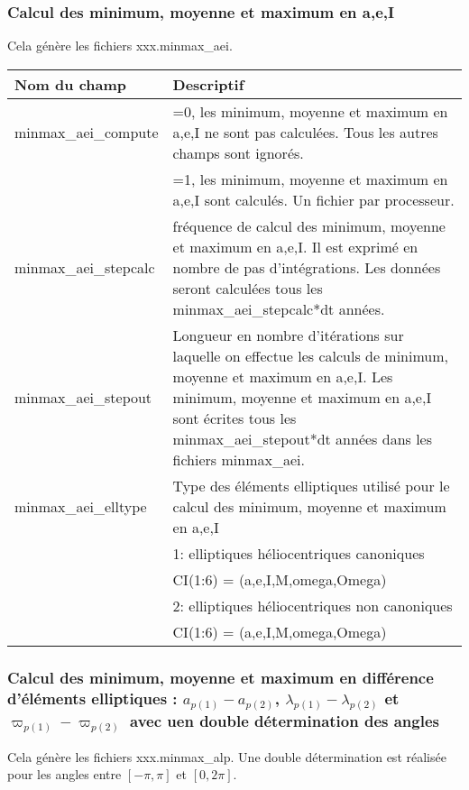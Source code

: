 \documentclass[11pt]{article}
\begin{document}
\vspace{0.5cm}
\subsubsection*{Calcul des minimum, moyenne et maximum en a,e,I}
Cela g\'en\`ere les fichiers xxx.minmax\_aei.

\begin{tabularx}{\textwidth}{|l|X|}
\hline
Nom du champ& Descriptif \\ \hline \hline
minmax\_aei\_compute &  =0, les minimum, moyenne et maximum en a,e,I ne sont pas calcul\'ees. Tous les autres champs sont ignor\'es.\\
&=1, les minimum, moyenne et maximum en a,e,I sont calcul\'es. Un fichier par processeur.\\ \hline

minmax\_aei\_stepcalc  & fr\'equence de calcul des minimum, moyenne et maximum en a,e,I. Il est exprim\'e en nombre de pas d'int\'egrations. Les donn\'ees seront calcul\'ees tous les minmax\_aei\_stepcalc*dt ann\'ees. \\ \hline

minmax\_aei\_stepout  & Longueur en nombre d'it\'erations sur laquelle on effectue les calculs de minimum, moyenne et maximum en a,e,I. Les minimum, moyenne et maximum en a,e,I sont \'ecrites tous les minmax\_aei\_stepout*dt ann\'ees dans les fichiers minmax\_aei.\\ \hline

minmax\_aei\_elltype  & Type des \'el\'ements elliptiques utilis\'e pour le calcul des  minimum, moyenne et maximum en a,e,I\\ 
&1:  elliptiques h\'eliocentriques canoniques\\
&	     CI(1:6) = (a,e,I,M,omega,Omega)\\
&2:  elliptiques h\'eliocentriques non canoniques\\
&	     CI(1:6) = (a,e,I,M,omega,Omega)\\ \hline

 \end{tabularx}

\vspace{0.5cm}
\subsubsection*{Calcul des minimum, moyenne et maximum en diff\'erence d'\'el\'ements elliptiques : $a_{p(1)}-a_{p(2)}$, $\lambda_{p(1)}-\lambda_{p(2)}$ et $\varpi_{p(1)}-\varpi_{p(2)}$ avec uen double détermination des angles}
Cela g\'en\`ere les fichiers xxx.minmax\_alp.
Une double détermination est réalisée pour les angles entre $[-\pi,\pi]$ et $[0,2\pi]$.
\end{document}
